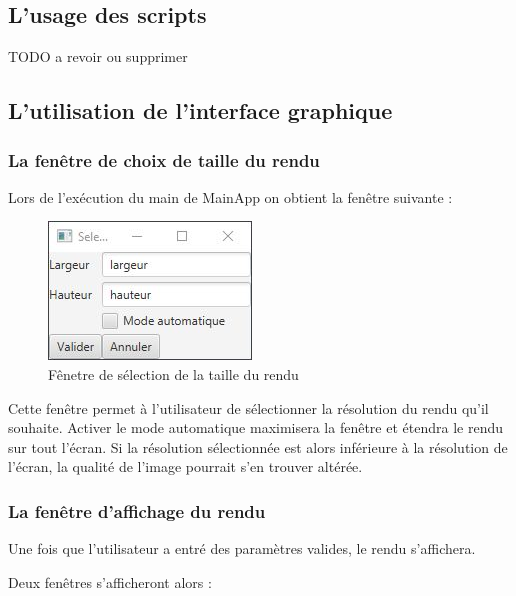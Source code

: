 \subsection{L'usage des scripts}
TODO a revoir ou supprimer
\subsection{L'utilisation de l'interface graphique}

\subsubsection{La fenêtre de choix de taille du rendu}

Lors de l'exécution du main de MainApp on obtient la fenêtre suivante :
\begin{figure}[h]
   \caption{Fênetre de sélection de la taille du rendu}
   \begin{center}
       \includegraphics{img/render.javafx/choiceWindow.jpg}
   \end{center}
\end{figure}

Cette fenêtre permet à l'utilisateur de sélectionner la résolution du rendu qu'il souhaite.
Activer le mode automatique maximisera la fenêtre et étendra le rendu sur tout l'écran. Si la résolution sélectionnée est alors inférieure à la résolution de l'écran, la qualité de l'image pourrait s'en trouver altérée.

\subsubsection{La fenêtre d'affichage du rendu}

Une fois que l'utilisateur a entré des paramètres valides, le rendu s'affichera.

Deux fenêtres s'afficheront alors :

